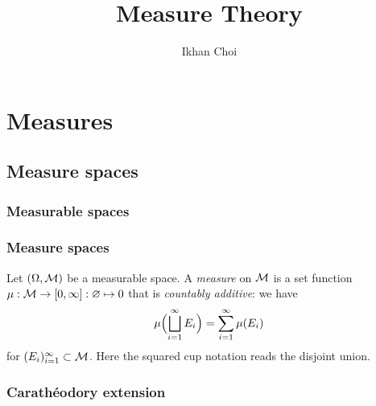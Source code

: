\documentclass{../note}
\begin{document}
\title{Measure Theory}
\author{Ikhan Choi}
\maketitle
\tableofcontents

\part{Measures}





\chapter{Measure spaces}


\section{Measurable spaces}

\begin{prb}

\end{prb}



\section{Measure spaces}

\begin{prb}
Let $(\Omega,\mathcal{M})$ be a measurable space.
A \emph{measure} on $\mathcal{M}$ is a set function $\mu:\mathcal{M}\to[0,\infty]:\varnothing\mapsto0$ that is \emph{countably additive}: we have
\[\mu\Bigl(\bigsqcup_{i=1}^\infty E_i\Bigr)=\sum_{i=1}^\infty\mu(E_i)\]
for $(E_i)_{i=1}^\infty\subset\mathcal{M}$.
Here the squared cup notation reads the disjoint union.
\end{prb}

\begin{prb}
\end{prb}

\begin{prb}
\end{prb}

\begin{prb}
\end{prb}



\section{Carath\'eodory extension}
\end{document}
